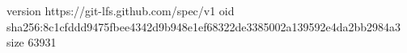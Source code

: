 version https://git-lfs.github.com/spec/v1
oid sha256:8c1cfddd9475fbee4342d9b948e1ef68322de3385002a139592e4da2bb2984a3
size 63931
